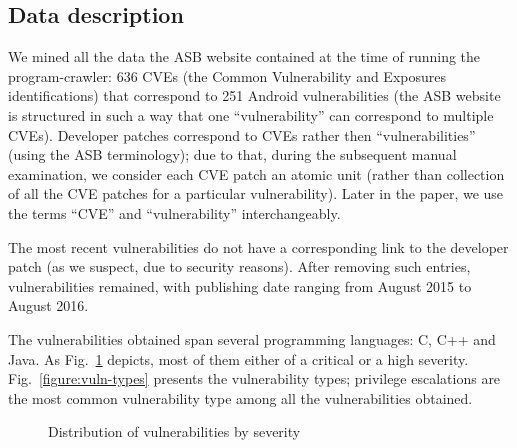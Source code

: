 \subsection{Data description}

We mined all the data the ASB website contained at the time of running the program-crawler: 636 CVEs (the Common Vulnerability and Exposures identifications) that correspond to 251 Android vulnerabilities (the ASB website is structured in such a way that one ``vulnerability'' can correspond to multiple CVEs). Developer patches correspond to CVEs rather then ``vulnerabilities'' (using the ASB terminology); due to that, during the subsequent manual examination, we consider each CVE patch an atomic unit (rather than collection of all the CVE patches for a particular vulnerability). Later in the paper, we use the terms ``CVE'' and ``vulnerability'' interchangeably. %

The most recent vulnerabilities do not have a corresponding link to the developer patch (as we suspect, due to security reasons). After removing such entries, \numvuln vulnerabilities remained, with publishing date ranging from August 2015 to August 2016.

The vulnerabilities obtained span several programming languages: C, C++ and Java. As Fig.~\ref{figure:severity} depicts, most of them either of a critical or a high severity. Fig.~\ref{figure:vuln-types} presents the vulnerability types; privilege escalations are the most common vulnerability type among all the vulnerabilities obtained.

\begin{figure}
    \small \caption{Distribution of vulnerabilities by severity}
        \label{figure:severity}
\end{figure}

